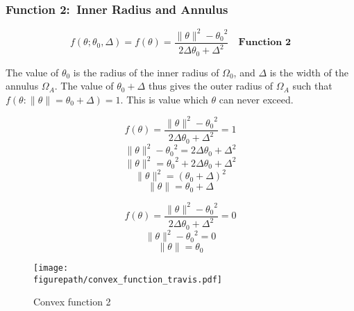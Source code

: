 \subsubsection{Function 2:\ Inner Radius and Annulus}

\begin{equation*}
  f(\theta;{\theta_{0}},\Delta)=f(\theta)=\frac{\|\theta\|^{2}-{\theta_{0}}^{2}}{2\Delta{\theta_{0}}+\Delta^{2}}\quad\textbf{Function 2}
\end{equation*}

The value of $\theta_{0}$ is the radius of the inner radius of $\Omega_{0}$, and $\Delta$ is the width of the annulus $\Omega_{A}$.
The value of $\theta_{0}+\Delta$ thus gives the outer radius of $\Omega_{A}$ such that $f(\theta:\|\theta\|=\theta_{0}+\Delta)=1$.
This is value which $\theta$ can never exceed.

\begin{equation*}
  f(\theta)=\frac{\|\theta\|^{2}-{\theta_{0}}^{2}}{2\Delta{\theta_{0}}+\Delta^{2}}=1
\end{equation*}
\begin{equation*}
  \|\theta\|^{2}-{\theta_{0}}^{2}=2\Delta{\theta_{0}}+\Delta^{2}
\end{equation*}
\begin{equation*}
  \|\theta\|^{2}={\theta_{0}}^{2}+2\Delta{\theta_{0}}+\Delta^{2}
\end{equation*}
\begin{equation*}
  \|\theta\|^{2}=({\theta_{0}}+\Delta)^{2}
\end{equation*}
\begin{equation*}
  \|\theta\|={\theta_{0}}+\Delta
\end{equation*}

\begin{equation*}
  f(\theta)=\frac{\|\theta\|^{2}-{\theta_{0}}^{2}}{2\Delta{\theta_{0}}+\Delta^{2}}=0
\end{equation*}
\begin{equation*}
  \|\theta\|^{2}-{\theta_{0}}^{2}=0
\end{equation*}
\begin{equation*}
  \|\theta\|={\theta_{0}}
\end{equation*}

\begin{figure}[H]
  \begin{center}
    \texttt{[image: \\figurepath/convex\_function\_travis.pdf]}
    \caption{Convex function 2}
  \end{center}
\end{figure}

